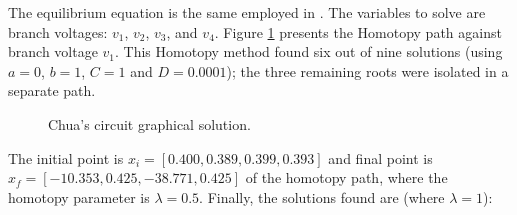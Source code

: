 \documentclass[conference,letterpaper,onecolumn]{IEEEtran}
\begin{document}
The equilibrium equation is the same employed in \cite{homo_chua}. The variables to solve are branch voltages: $v_1$, $v_2$, $v_3$, and $v_4$. Figure \ref{chuaf} presents the Homotopy path against branch voltage $v_1$. This Homotopy method found six out of nine solutions (using $a=0$, $b=1$, $C=1$ and $D=0.0001$); the three remaining roots were isolated in a separate path.

\begin{figure}[hbtp]
\centerline{
\epsfxsize=40mm
\epsfxsize=40mm
\epsfxsize=40mm
}
\caption{Chua's circuit graphical solution.}
\label{chuaf}
\end{figure}

The initial point is $x_i=[0.400, 0.389, 0.399, 0.393]$ and final point is $x_f=[-10.353,0.425,-38.771,0.425]$ of the homotopy path, where the homotopy parameter is $\lambda=0.5$.
Finally, the solutions found are (where $\lambda=1$):
\end{document}
